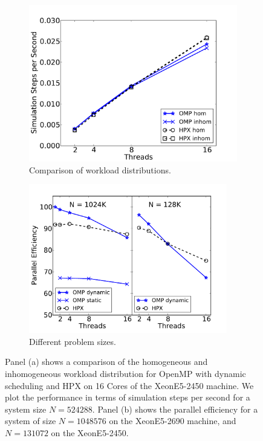 \documentclass[10pt]{elsarticle}
\begin{document}
\begin{figure}
 \begin{subfigure}[b]{0.49\textwidth}
  \centering
  \includegraphics[width=\textwidth]{comp_hom_inhom_marvin.pdf}
  \caption{Comparison of workload distributions.} 
  \label{fig:comp_hom_inhom_marvin}
 \end{subfigure}
 \begin{subfigure}[b]{0.51\textwidth}
  \centering
  \includegraphics[width=0.95\textwidth]{scaling_inhom_1024K_128K.pdf}
  \caption{Different problem sizes.} 
  \label{fig:inhom_1024K}
 \end{subfigure}
 \caption{Panel (a) shows a comparison of the homogeneous and inhomogeneous workload distribution for OpenMP with dynamic scheduling and HPX on 16 Cores of the XeonE5-2450 machine. We plot the performance in terms of simulation steps per second for a system size $N=524288$. Panel (b) shows the parallel efficiency for a system of size $N=1048576$ on the XeonE5-2690 machine, and $N=131072$ on the XeonE5-2450.}
 \label{fig:inhom_2}
\end{figure}
\end{document}
